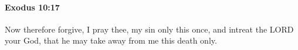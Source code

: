
		\paragraph{Exodus 10:17} %
			\label{EXODUS-10-17}

			Now therefore forgive, I pray thee, my sin only this once, and intreat the LORD your God, that he may take away from me this death only.


